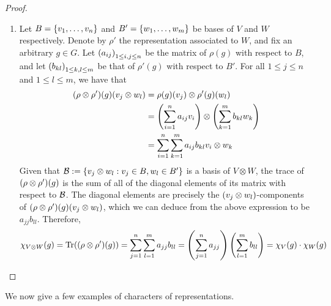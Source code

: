 \begin{proof}
\begin{enumerate}[noitemsep]
        \item Let $B = \left\{ v_1, \ldots, v_n \right\}$ and $B' = \left\{ w_1, \ldots, w_m \right\}$ be bases of $V$ and $W$ respectively. Denote by $\rho'$ the representation associated to $W$, and fix an arbitrary $g \in G$. Let $\left( a_{ij} \right)_{1 \leq i, j \leq n}$ be the matrix of $\rho(g)$ with respect to $B$, and let $\left( b_{kl} \right)_{1 \leq k, l \leq m}$ be that of $\rho'(g)$ with respect to $B'$. %
        For all $1 \leq j \leq n$ and $1 \leq l \leq m$, we have that
        \begin{align*}
            \left( \rho \otimes \rho' \right)\!(g)(v_j \otimes w_l) &= \rho(g)(v_j) \otimes \rho'(g)(w_l) \\
            &= \left( \sum_{i=1}^{n} a_{ij} v_i \right) \otimes \left( \sum_{k=1}^{m} b_{kl} w_k \right) \\
            &= \sum_{i=1}^{n} \sum_{k=1}^{m} a_{ij} b_{kl} v_i \otimes w_k
        \end{align*}
        Given that $\mathcal{B} := \left\{ v_j \otimes w_l : v_j \in B, w_l \in B' \right\}$ is a basis of $V \otimes W$, the trace of $\left( \rho \otimes \rho' \right)\!(g)$ is the sum of all of the diagonal elements of its matrix with respect to $\mathcal{B}$. The diagonal elements are precisely the $\left( v_j \otimes w_l \right)$-components of $\left( \rho \otimes \rho' \right)\!(g)(v_j \otimes w_l)$, which we can deduce from the above expression to be $a_{jj}b_{ll}$. Therefore,
        \begin{align*}
            \chiof{V \otimes W}{g} = \Tr{\parenth{\rho \otimes \rho'}\!(g)} %
            = \sum_{j=1}^{n} \sum_{l=1}^{m} a_{jj} b_{ll} %
            = \parenth{\sum_{j=1}^{n} a_{jj}} \parenth{\sum_{l=1}^{m} b_{ll}} %
            = \chiof{V}{g} \cdot \chiof{W}{g}
        \end{align*}
    \end{enumerate}
\end{proof}

We now give a few examples of characters of representations.

